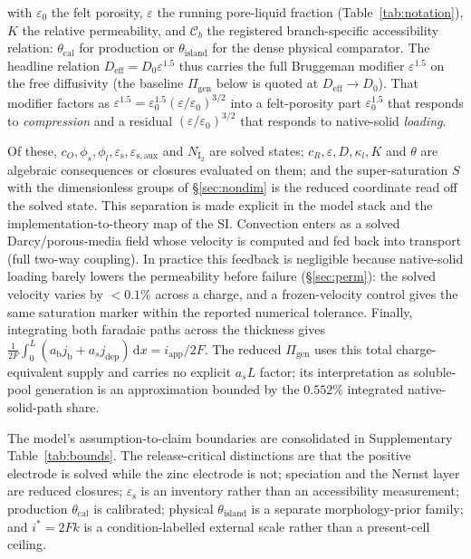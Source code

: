 \documentclass[11pt]{article}
\newcommand{\epss}{\varepsilon_{\mathrm{s}}}
\newcommand{\epsl}{\varepsilon}
\newcommand{\iapp}{i_{\mathrm{app}}}
\newcommand{\Deff}{D_{\mathrm{eff}}}
\newcommand{\thetacal}{\theta_{\mathrm{cal}}}
\newcommand{\thetaisland}{\theta_{\mathrm{island}}}
\begin{document}
with $\varepsilon_0$ the felt porosity, $\epsl$ the running pore-liquid fraction (Table~\ref{tab:notation}),
$K$ the relative permeability, and $\mathcal{C}_{b}$ the registered branch-specific accessibility relation:
$\thetacal$ for production or $\thetaisland$ for the dense physical comparator. The headline relation
$\Deff=D_0\epsl^{1.5}$ thus carries the full Bruggeman modifier $\epsl^{1.5}$ on the
free diffusivity (the baseline $\Pi_{\mathrm{gen}}$ below is quoted at $\Deff\!\to\!D_0$). That modifier
factors as $\epsl^{1.5}=\varepsilon_0^{1.5}(\epsl/\varepsilon_0)^{3/2}$ into a felt-porosity part
$\varepsilon_0^{1.5}$ that responds to \emph{compression} and a residual $(\epsl/\varepsilon_0)^{3/2}$ that
responds to native-solid \emph{loading}.

Of these, $c_O,\phi_s,\phi_l,\epss,\varepsilon_{\mathrm{s,aux}}$ and $N_{\mathrm{I_2}}$ are solved states;
$c_R,\epsl,D,\kappa_l,K$ and $\theta$ are algebraic consequences or closures evaluated on them; and the
super-saturation $S$ with the dimensionless groups of
\S\ref{sec:nondim} is the reduced coordinate read off the solved state. This separation is made explicit in
the model stack and the implementation-to-theory map of the SI. Convection enters as
a solved Darcy/porous-media field whose velocity is computed and fed back into transport (full two-way
coupling). In practice this feedback is negligible because native-solid loading barely lowers the permeability
before failure (\S\ref{sec:perm}): the solved velocity varies by $<\!0.1\%$ across a charge, and a
frozen-velocity control gives the same saturation marker within the reported numerical tolerance. Finally,
integrating both faradaic paths across the thickness gives
$\tfrac{1}{2F}\!\int_0^L(a_{\mathrm b}j_{\mathrm b}+a_sj_{\mathrm{dep}})\,\mathrm{d}x=\iapp/2F$.
The reduced $\Pi_{\mathrm{gen}}$ uses this total charge-equivalent supply and carries no explicit $a_sL$ factor;
its interpretation as soluble-pool generation is an approximation bounded by the $0.552\%$ integrated
native-solid-path share.

The model's assumption-to-claim boundaries are consolidated in Supplementary Table~\ref{tab:bounds}. The
release-critical distinctions are that the positive electrode is solved while the zinc electrode is not;
speciation and the Nernst layer are reduced closures; $\epss$ is an inventory rather than an accessibility
measurement; production $\thetacal$ is calibrated; physical $\thetaisland$ is a separate morphology-prior
family; and $i^{*}=2Fk$ is a condition-labelled external scale rather than a present-cell ceiling.
\end{document}
